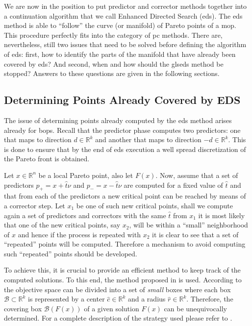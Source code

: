 We are now in the position to put predictor and corrector methods together into a continuation algorithm that we call Enhanced Directed Search (\gls{eds}). The \gls{eds} method is able to ``follow'' the curve (or manifold) of Pareto points of a \gls{mop}. This procedure perfectly fits into the category of \gls{pc} methods. There are, nevertheless, still two issues that need to be solved before defining the algorithm of \gls{eds}: first, how to identify the parts of the manifold that have already been covered by \gls{eds}? And second, when and how should the gls{eds} method be stopped? Answers to these questions are given in the following sections.

\subsection{Determining Points Already Covered by EDS}
\label{sec:handling_kg2}

The issue of determining points already computed by the \gls{eds} method arises already for \glspl{bop}. Recall that the predictor phase computes two predictors: one that maps to direction $d \in \mathbb{R}^k$ and another that maps to direction $-d \in \mathbb{R}^k$. This is done to ensure that by the end of \gls{eds} execution a well spread discretization of the Pareto front is obtained.

Let $x \in \mathbb{R}^n$ be a local Pareto point, also let $F(x)$. Now, assume that a set of predictors $p_+ = x + \hat{t} \nu$ and $p_- = x - \hat{t} \nu$ are computed for a fixed value of $\hat{t}$ and that from each of the predictors a new critical point can be reached by means of a corrector step. Let $x_1$ be one of such new critical points, shall we compute again a set of predictors and correctors with the same $\hat{t}$ from $x_1$ it is most likely that one of the new critical points, say $x_2$, will be within a ``small'' neighborhood of $x$ and hence if the process is repeated with $x_2$ it is clear to see that a set of ``repeated'' points will be computed. Therefore a mechanism to avoid computing such ``repeated'' points should be developed.

To achieve this, it is crucial to provide an efficient method to keep track of the computed solutions. To this end, the method proposed in \cite{pareto_tracer} is used. According to \cite{pareto_tracer} the objective space can be divided into a set of \emph{small} boxes where each box $\mathcal{B} \subset \mathbb{R}^k$ is represented by a center $\hat{c} \in \mathbb{R}^k$ and a radius $\hat{r} \in \mathbb{R}^k$. Therefore, the covering box $\mathcal{B}(F(x))$ of a given solution $F(x)$ can be unequivocally determined. For a complete description of the strategy used please refer to \cite{pareto_tracer}.

